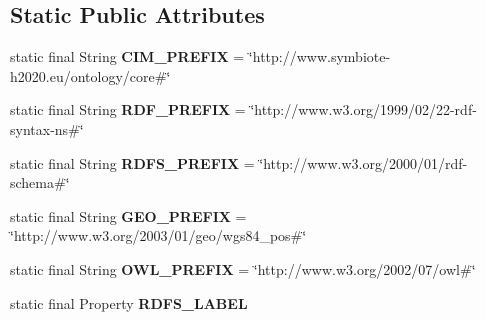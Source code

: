 \subsection*{Static Public Attributes}
\begin{DoxyCompactItemize}
\item 
static final String {\bfseries C\+I\+M\+\_\+\+P\+R\+E\+F\+IX} = \char`\"{}http\+://www.\+symbiote-\/h2020.\+eu/ontology/core\#\char`\"{}\hypertarget{classeu_1_1h2020_1_1symbiote_1_1ontology_1_1model_1_1CoreInformationModel_a616634a6598159f65ad09d456e9da507}{}\label{classeu_1_1h2020_1_1symbiote_1_1ontology_1_1model_1_1CoreInformationModel_a616634a6598159f65ad09d456e9da507}

\item 
static final String {\bfseries R\+D\+F\+\_\+\+P\+R\+E\+F\+IX} = \char`\"{}http\+://www.\+w3.\+org/1999/02/22-\/rdf-\/syntax-\/ns\#\char`\"{}\hypertarget{classeu_1_1h2020_1_1symbiote_1_1ontology_1_1model_1_1CoreInformationModel_ae03026d29c3d56365d1efc029176b02d}{}\label{classeu_1_1h2020_1_1symbiote_1_1ontology_1_1model_1_1CoreInformationModel_ae03026d29c3d56365d1efc029176b02d}

\item 
static final String {\bfseries R\+D\+F\+S\+\_\+\+P\+R\+E\+F\+IX} = \char`\"{}http\+://www.\+w3.\+org/2000/01/rdf-\/schema\#\char`\"{}\hypertarget{classeu_1_1h2020_1_1symbiote_1_1ontology_1_1model_1_1CoreInformationModel_a1eeee42041f614e80aa328419a7c291f}{}\label{classeu_1_1h2020_1_1symbiote_1_1ontology_1_1model_1_1CoreInformationModel_a1eeee42041f614e80aa328419a7c291f}

\item 
static final String {\bfseries G\+E\+O\+\_\+\+P\+R\+E\+F\+IX} = \char`\"{}http\+://www.\+w3.\+org/2003/01/geo/wgs84\+\_\+pos\#\char`\"{}\hypertarget{classeu_1_1h2020_1_1symbiote_1_1ontology_1_1model_1_1CoreInformationModel_a3d256d6ae2f5cacf2ecdc4e7314f8b06}{}\label{classeu_1_1h2020_1_1symbiote_1_1ontology_1_1model_1_1CoreInformationModel_a3d256d6ae2f5cacf2ecdc4e7314f8b06}

\item 
static final String {\bfseries O\+W\+L\+\_\+\+P\+R\+E\+F\+IX} = \char`\"{}http\+://www.\+w3.\+org/2002/07/owl\#\char`\"{}\hypertarget{classeu_1_1h2020_1_1symbiote_1_1ontology_1_1model_1_1CoreInformationModel_aa358a851fe25eb78ef023e04b9da75e5}{}\label{classeu_1_1h2020_1_1symbiote_1_1ontology_1_1model_1_1CoreInformationModel_aa358a851fe25eb78ef023e04b9da75e5}

\item 
static final Property {\bfseries R\+D\+F\+S\+\_\+\+L\+A\+B\+EL}\hypertarget{classeu_1_1h2020_1_1symbiote_1_1ontology_1_1model_1_1CoreInformationModel_a10f7b98e8a37e005f26b01944ef4d19e}{}\label{classeu_1_1h2020_1_1symbiote_1_1ontology_1_1model_1_1CoreInformationModel_a10f7b98e8a37e005f26b01944ef4d19e}


\end{DoxyCompactItemize}
